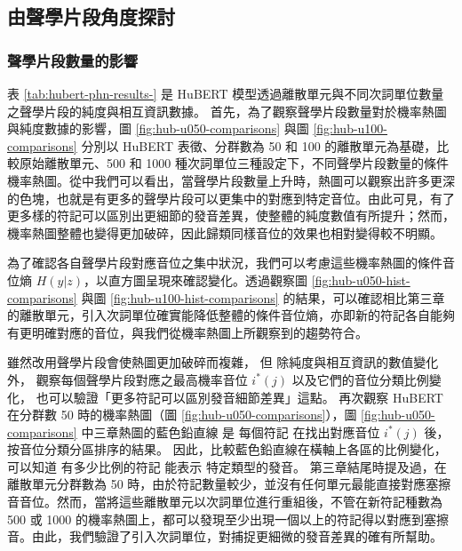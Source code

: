 \subsection{由聲學片段角度探討}
{
\subsubsection{聲學片段數量的影響}





表 \ref{tab:hubert-phn-results-} 是 HuBERT 模型透過離散單元與不同次詞單位數量之聲學片段的純度與相互資訊數據。
首先，為了觀察聲學片段數量對於機率熱圖與純度數據的影響，圖 \ref{fig:hub-u050-comparisons} 與圖 \ref{fig:hub-u100-comparisons} 分別以
HuBERT 表徵、分群數為 50 和 100 的離散單元為基礎，比較原始離散單元、500 和 1000 種次詞單位三種設定下，不同聲學片段數量的條件機率熱圖。從中我們可以看出，當聲學片段數量上升時，熱圖可以觀察出許多更深的色塊，也就是有更多的聲學片段可以更集中的對應到特定音位。由此可見，有了更多樣的符記可以區別出更細節的發音差異，使整體的純度數值有所提升；然而，機率熱圖整體也變得更加破碎，因此歸類同樣音位的效果也相對變得較不明顯。

        為了確認各自聲學片段對應音位之集中狀況，我們可以考慮這些機率熱圖的條件音位熵 $H(y|z)$，以直方圖呈現來確認變化。透過觀察圖 \ref{fig:hub-u050-hist-comparisons} 與圖 \ref{fig:hub-u100-hist-comparisons} 的結果，可以確認相比第三章的離散單元，引入次詞單位確實能降低整體的條件音位熵，亦即新的符記各自能夠有更明確對應的音位，與我們從機率熱圖上所觀察到的趨勢符合。
        

        雖然改用聲學片段會使熱圖更加破碎而複雜，
但
除純度與相互資訊的數值變化外，
觀察每個聲學片段對應之最高機率音位 $i^*(j)$ 以及它們的音位分類比例變化，
也可以驗證「更多符記可以區別發音細節差異」這點。
再次觀察 HuBERT 在分群數 50 時的機率熱圖（圖 \ref{fig:hub-u050-comparisons}），圖 \ref{fig:hub-u050-comparisons} 中三章熱圖的藍色鉛直線
是
每個符記
在找出對應音位 $i^*(j)$ 後，按音位分類分區排序的結果。
因此，比較藍色鉛直線在橫軸上各區的比例變化，
可以知道
有多少比例的符記
能表示
特定類型的發音。
第三章結尾時提及過，在離散單元分群數為 50 時，由於符記數量較少，並沒有任何單元最能直接對應塞擦音音位。然而，當將這些離散單元以次詞單位進行重組後，不管在新符記種數為 500 或 1000 的機率熱圖上，都可以發現至少出現一個以上的符記得以對應到塞擦音。由此，我們驗證了引入次詞單位，對捕捉更細微的發音差異的確有所幫助。

}
